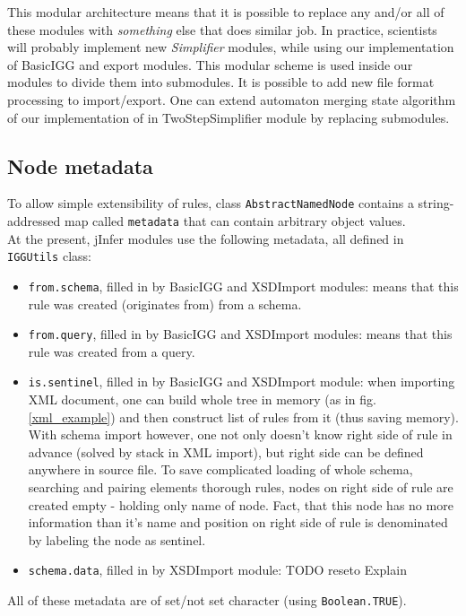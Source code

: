 \documentclass[a4paper,10pt,oneside]{article}
\newcommand{\code}[1]{\texttt{#1}}
\newcommand{\jmodule}[1]{\emph{#1}}
\begin{document}
This modular architecture means that it is possible to replace any and/or all of these modules with \emph{something} else that does similar job. In practice, scientists will probably implement new \jmodule{Simplifier} modules, while using our implementation of BasicIGG and export modules. This modular scheme is used inside our modules to divide them into submodules. It is possible to add new file format processing to import/export. One can extend automaton merging state algorithm of our implementation of \cite{ahonen} in TwoStepSimplifier module by replacing submodules.

\subsection{Node metadata} \label{section_metadata}
To allow simple extensibility of rules, class \code{AbstractNamedNode} contains a string-addressed map called \code{metadata} that can contain arbitrary object values.\\

At the present, jInfer modules use the following metadata, all defined in \code{IGGUtils} class:
\begin{itemize}
	\item \code{from.schema}, filled in by BasicIGG and XSDImport modules: means that this rule was created (originates from) from a schema.
	\item \code{from.query}, filled in by BasicIGG and XSDImport modules: means that this rule was created from a query.
	\item \code{is.sentinel}, filled in by  BasicIGG and XSDImport module: when importing XML document, one can build whole tree in memory (as in fig. \ref{xml_example}) and then construct list of rules from it (thus saving memory). With schema import however, one not only doesn't know right side of rule in advance (solved by stack in XML import), but right side can be defined anywhere in source file. To save complicated loading of whole schema, searching and pairing elements thorough rules, nodes on right side of rule are created empty - holding only name of node. Fact, that this node has no more information than it's name and position on right side of rule is denominated by labeling the node as sentinel.
	\item \code{schema.data}, filled in by XSDImport module: TODO reseto Explain
\end{itemize}
All of these metadata are of set/not set character (using \code{Boolean.TRUE}).
\end{document}
